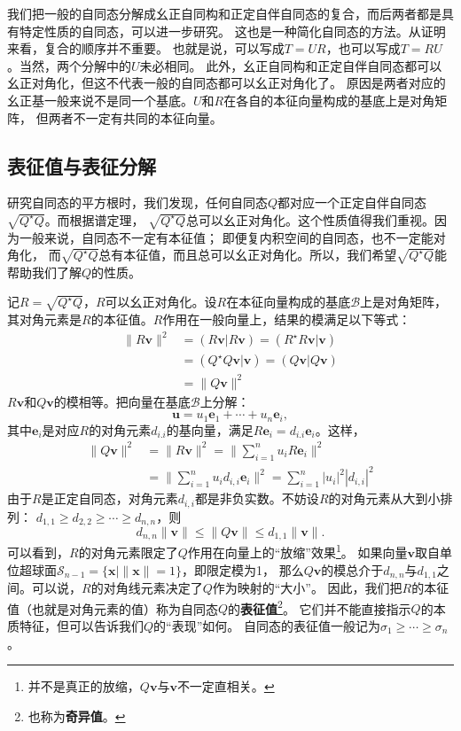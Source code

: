 \documentclass[12pt,UTF8]{ctexbook}
\begin{document}
我们把一般的自同态分解成幺正自同构和正定自伴自同态的复合，而后两者都是具有特定性质的自同态，可以进一步研究。
这也是一种简化自同态的方法。从证明来看，复合的顺序并不重要。
也就是说，可以写成$T = UR$，也可以写成$T = RU$。当然，两个分解中的$U$未必相同。
此外，幺正自同构和正定自伴自同态都可以幺正对角化，但这不代表一般的自同态都可以幺正对角化了。
原因是两者对应的幺正基一般来说不是同一个基底。$U$和$R$在各自的本征向量构成的基底上是对角矩阵，
但两者不一定有共同的本征向量。

\subsection{表征值与表征分解}
研究自同态的平方根时，我们发现，任何自同态$Q$都对应一个正定自伴自同态$\sqrt{Q^\star Q}$。而根据谱定理，
$\sqrt{Q^\star Q}$总可以幺正对角化。这个性质值得我们重视。因为一般来说，自同态不一定有本征值；
即便复内积空间的自同态，也不一定能对角化，
而$\sqrt{Q^\star Q}$总有本征值，而且总可以幺正对角化。所以，我们希望$\sqrt{Q^\star Q}$能帮助我们了解$Q$的性质。

记$R = \sqrt{Q^\star Q}$，$R$可以幺正对角化。设$R$在本征向量构成的基底$\mathcal{B}$上是对角矩阵，
其对角元素是$R$的本征值。$R$作用在一般向量上，结果的模满足以下等式：
\begin{align*}
    \| R\mathbf{v} \|^2 &= (R\mathbf{v} | R\mathbf{v}) = (R^\star R\mathbf{v} | \mathbf{v})  \\
    &= (Q^\star Q\mathbf{v} | \mathbf{v}) = (Q\mathbf{v} | Q\mathbf{v})  \\
    &= \| Q\mathbf{v} \|^2 
\end{align*}
$R\mathbf{v}$和$Q\mathbf{v}$的模相等。把向量在基底$\mathcal{B}$上分解：
$$ \mathbf{u} = u_1\mathbf{e}_1 + \cdots + u_n\mathbf{e}_i,$$
其中$\mathbf{e}_i$是对应$R$的对角元素$d_{i.i}$的基向量，满足$R\mathbf{e}_i = d_{i.i}\mathbf{e}_i$。这样，
\begin{align*}
    \| Q\mathbf{v} \|^2 &= \| R\mathbf{v} \|^2 = \| \sum_{i=1}^n u_i R\mathbf{e}_i \|^2   \\
    &= \| \sum_{i=1}^n u_i d_{i,i}\mathbf{e}_i \|^2 = \sum_{i=1}^n |u_i|^2 |d_{i,i}|^2  
\end{align*}
由于$R$是正定自同态，对角元素$d_{i,i}$都是非负实数。不妨设$R$的对角元素从大到小排列：
$d_{1,1} \geqslant d_{2,2} \geqslant \cdots \geqslant d_{n,n}$，则
$$ d_{n,n} \| \mathbf{v} \| \leqslant \| Q\mathbf{v} \| \leqslant d_{1,1} \| \mathbf{v} \|. $$
可以看到，$R$的对角元素限定了$Q$作用在向量上的“放缩”效果\footnote{并不是真正的放缩，$Q\mathbf{v}$与$\mathbf{v}$不一定直相关。}。
如果向量$\mathbf{v}$取自单位超球面$\mathcal{S}_{n-1} = \{\mathbf{x} | \| \mathbf{x} \| = 1 \}$，即限定模为1，
那么$Q\mathbf{v}$的模总介于$d_{n,n}$与$d_{1,1}$之间。可以说，$R$的对角线元素决定了$Q$作为映射的“大小”。
因此，我们把$R$的本征值（也就是对角元素的值）称为自同态$Q$的\textbf{表征值}\footnote{也称为\textbf{奇异值}。}。
它们并不能直接指示$Q$的本质特征，但可以告诉我们$Q$的“表现”如何。
自同态的表征值一般记为$\sigma_1 \geqslant \cdots \geqslant \sigma_n$。
\end{document}

